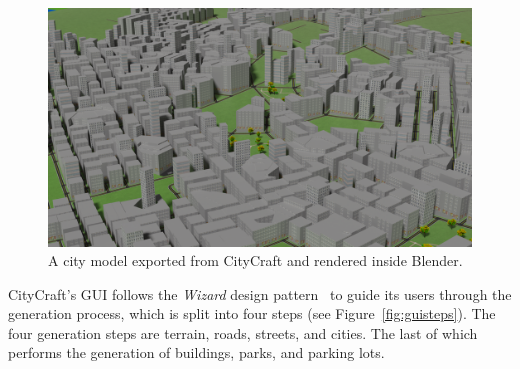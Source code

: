 \begin{figure}[H]
  \centering
  \includegraphics[width=\textwidth]{figure/results/blender_render}

  \caption{A city model exported from CityCraft and rendered inside Blender.}
  \label{fig:blender}
\end{figure}

CityCraft's GUI follows the \textit{Wizard} design pattern~\cite{yer_a_wizard} to guide its users through the generation process, which is split into four steps (see Figure~\ref{fig:guisteps}).
The four generation steps are terrain, roads, streets, and cities.
The last of which performs the generation of buildings, parks, and parking lots. 

